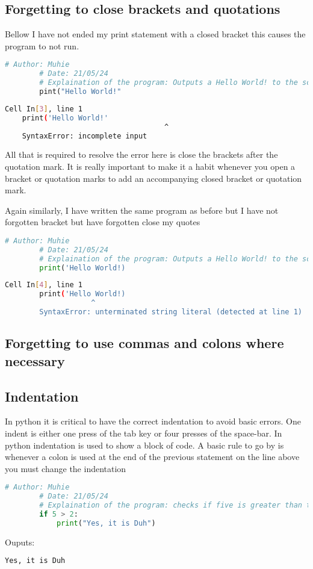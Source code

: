 \documentclass{article}
\begin{document}
	\subsection{Forgetting to close brackets and quotations}
	Bellow I have not ended my print statement with a closed bracket this causes the program to not run.
	\begin{lstlisting}[language=Python]
		# Author: Muhie
		# Date: 21/05/24
		# Explaination of the program: Outputs a Hello World! to the screen
		pint("Hello World!"
	\end{lstlisting}
	\begin{lstlisting}[language=Bash]
	  Cell In[3], line 1
	print('Hello World!'
					   				 ^
	SyntaxError: incomplete input
	\end{lstlisting}
	All that is required to resolve the error here is close the brackets after the quotation mark. It is really important to make it a habit whenever you open a bracket or quotation marks to add an accompanying closed bracket or quotation mark.
	
	Again similarly, I have written the same program as before but I have not forgotten bracket but have forgotten close my quotes
		\begin{lstlisting}[language=Python]
		# Author: Muhie
		# Date: 21/05/24
		# Explaination of the program: Outputs a Hello World! to the screen
		print('Hello World!)
	\end{lstlisting}
	\begin{lstlisting}[language=Bash]
		  Cell In[4], line 1
		print('Hello World!)
					^
		SyntaxError: unterminated string literal (detected at line 1)
	\end{lstlisting}
	\subsection{Forgetting to use commas and colons where necessary}
	\subsection{Indentation}
	In python it is critical to have the correct indentation to avoid basic errors. One indent is either one press of the tab key or four presses of the space-bar. In python indentation is used to show a block of code.
	A basic rule to go by is whenever a colon is used at the end of the previous statement on the line above you must change the indentation
	\begin{lstlisting}[language=Python]
		# Author: Muhie
		# Date: 21/05/24
		# Explaination of the program: checks if five is greater than two and prints Yes it is Duh
		if 5 > 2:
			print("Yes, it is Duh")
	\end{lstlisting}
	Ouputs:
	\begin{lstlisting}[language=Bash]
		Yes, it is Duh
	
	\end{lstlisting}
	
\end{document}
